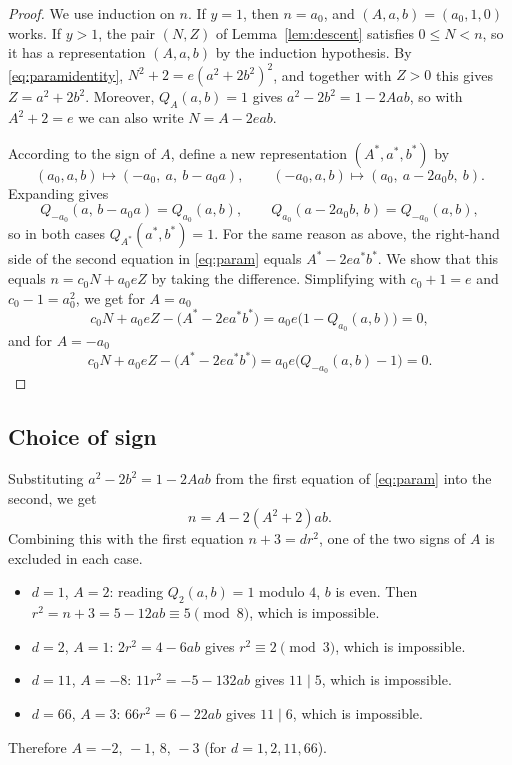 \documentclass[a4paper,11pt]{article}
\theoremstyle{plain}
\theoremstyle{definition}
\theoremstyle{remark}
\numberwithin{equation}{section}
\numberwithin{table}{section}
\begin{document}
\begin{proof}
We use induction on $n$. If $y=1$, then $n=a_0$, and $(A,a,b)=(a_0,1,0)$ works.
If $y>1$, the pair $(N,Z)$ of Lemma~\ref{lem:descent} satisfies $0\le N<n$, so it has a representation $(A,a,b)$ by the induction hypothesis.
By \eqref{eq:paramidentity}, $N^2+2=e(a^2+2b^2)^2$, and together with $Z>0$ this gives $Z=a^2+2b^2$.
Moreover, $Q_A(a,b)=1$ gives $a^2-2b^2=1-2Aab$, so with $A^2+2=e$ we can also write $N=A-2eab$.

According to the sign of $A$, define a new representation $(A^*,a^*,b^*)$ by
\[
(a_0,a,b)\mapsto(-a_0,\ a,\ b-a_0a),\qquad(-a_0,a,b)\mapsto(a_0,\ a-2a_0b,\ b).
\]
Expanding gives
\[
Q_{-a_0}(a,\,b-a_0a)=Q_{a_0}(a,b),\qquad Q_{a_0}(a-2a_0b,\,b)=Q_{-a_0}(a,b),
\]
so in both cases $Q_{A^*}(a^*,b^*)=1$. For the same reason as above, the right-hand side of the second equation in \eqref{eq:param} equals $A^*-2ea^*b^*$.
We show that this equals $n=c_0N+a_0eZ$ by taking the difference. Simplifying with $c_0+1=e$ and $c_0-1=a_0^2$, we get for $A=a_0$
\[
c_0N+a_0eZ-\bigl(A^*-2ea^*b^*\bigr)=a_0e\bigl(1-Q_{a_0}(a,b)\bigr)=0,
\]
and for $A=-a_0$
\[
c_0N+a_0eZ-\bigl(A^*-2ea^*b^*\bigr)=a_0e\bigl(Q_{-a_0}(a,b)-1\bigr)=0.
\]
\end{proof}

\subsection{Choice of sign}

Substituting $a^2-2b^2=1-2Aab$ from the first equation of \eqref{eq:param} into the second, we get
\begin{equation}\label{eq:offset}
n=A-2(A^2+2)ab.
\end{equation}
Combining this with the first equation $n+3=dr^2$, one of the two signs of $A$ is excluded in each case.
\begin{itemize}
\item $d=1$, $A=2$: reading $Q_2(a,b)=1$ modulo $4$, $b$ is even. Then $r^2=n+3=5-12ab\equiv5\pmod8$, which is impossible.
\item $d=2$, $A=1$: $2r^2=4-6ab$ gives $r^2\equiv2\pmod3$, which is impossible.
\item $d=11$, $A=-8$: $11r^2=-5-132ab$ gives $11\mid5$, which is impossible.
\item $d=66$, $A=3$: $66r^2=6-22ab$ gives $11\mid6$, which is impossible.
\end{itemize}
Therefore $A=-2,\,-1,\,8,\,-3$ (for $d=1,2,11,66$).
\end{document}
